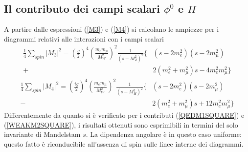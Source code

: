 \documentclass[11pt]{article}
\begin{document}
    \subsection*{Il contributo dei campi scalari $\phi^0$ e $H$}
    A partire dalle espressioni (\ref{M3}) e (\ref{M4}) si calcolano le ampiezze per i diagrammi relativi alle interazioni con i campi scalari
    \begin{equation}
    \begin{split}
    \frac{1}{4}\sum_{spin}\lvert M_3\rvert^2=\left(\frac{g}{2}\right)^4\left(\frac{m_em_\mu}{M_W^2}\right)^2\frac{1}{(s-M_Z^2)^2}\{&(s-2m_e^2)(s-2m_\mu^2)\\
     +&2(m_e^2+m_\mu^2)s-4m_e^2m_\mu^2\}
    \end{split}
    \end{equation}
    \begin{equation}
    \begin{split}
    \frac{1}{4}\sum_{spin}\lvert M_4\rvert^2=\left(\frac{ig}{2}\right)^4\left(\frac{m_em_\mu}{M_W^2}\right)^2\frac{1}{(s-M_H^2)^2}\{&(s-2m_e^2)(s-2m_\mu^2)\\
     -&2(m_e^2+m_\mu^2)s+12m_e^2m_\mu^2\}
    \end{split}
    \end{equation}
    Differentemente da quanto si è verificato per i contributi (\ref{QEDM1SQUARE}) e (\ref{WEAKM2SQUARE}), i risultati ottenuti sono esprimibili in termini del solo invariante di Mandelstam $s$.
    La dipendenza angolare è in questo caso uniforme: questo fatto è riconducibile all'assenza di spin sulle linee interne dei diagrammi.
\end{document}
